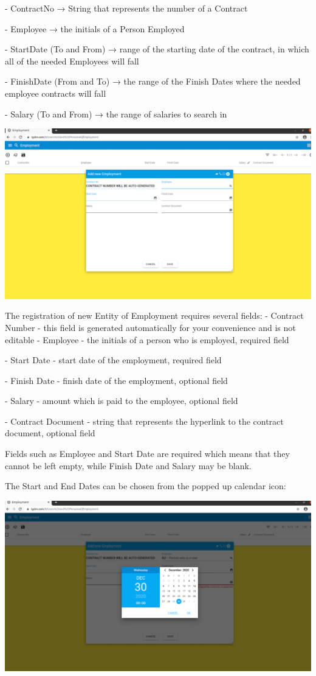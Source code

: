 - ContractNo → String that represents the number of a Contract

- Employee → the initials of a Person Employed

- StartDate (To and From) → range of the starting date of the contract, in which all of the needed Employees will fall

- FinishDate (From and To) → the range of the Finish Dates where the needed employee contracts will fall

- Salary (To and From) → the range of salaries to search in

\includegraphics[width=\textwidth]{sections/01-chapter/images/employment3.png}

The registration of new Entity of Employment requires several fields:
- Contract Number - this field is generated automatically for your convenience and is not editable
- Employee - the initials of a person who is employed, required field

- Start Date - start date of the employment, required field

- Finish Date - finish date of the employment, optional field

- Salary - amount which is paid to the employee, optional field

- Contract Document - string that represents the hyperlink to the contract document, optional field

Fields  such as Employee and Start Date are required which means that they cannot be left empty, while Finish Date and Salary may be blank.

The Start and End Dates can be chosen from the popped up calendar icon:

\includegraphics[width=\textwidth]{sections/01-chapter/images/employmentdates.png}


